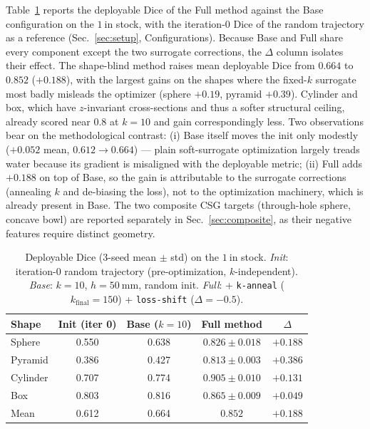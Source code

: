 Table~\ref{tab:main} reports the deployable Dice of the Full method against the
Base configuration on the $1~\mathrm{in}$ stock, with the iteration-0 Dice of the
random trajectory as a reference (Sec.~\ref{sec:setup}, Configurations). Because
Base and Full share every component except the two surrogate corrections, the
$\Delta$ column isolates their effect. The shape-blind method raises mean
deployable Dice from $0.664$ to $0.852$ ($+0.188$), with the largest gains on the
shapes where the fixed-$k$ surrogate most badly misleads the optimizer (sphere
$+0.19$, pyramid $+0.39$). Cylinder and box, which have $z$-invariant
cross-sections and thus a softer structural ceiling, already scored near $0.8$ at
$k{=}10$ and gain correspondingly less. Two observations bear on the
methodological contrast: (i) Base itself moves the init only modestly ($+0.052$
mean, $0.612 \to 0.664$) --- plain soft-surrogate optimization largely treads
water because its gradient is misaligned with the deployable metric; (ii) Full
adds $+0.188$ on top of Base, so the gain is attributable to the surrogate
corrections (annealing $k$ and de-biasing the loss), not to the optimization
machinery, which is already present in Base. The two composite CSG targets
(through-hole sphere, concave bowl) are reported separately in
Sec.~\ref{sec:composite}, as their negative features require distinct geometry.

\begin{table}[t]
  \centering
  \caption{Deployable Dice (3-seed mean $\pm$ std) on the $1~\mathrm{in}$ stock. \emph{Init}: iteration-0 random trajectory (pre-optimization, $k$-independent). \emph{Base}: $k{=}10$, $h{=}50~\mathrm{mm}$, random init. \emph{Full}: + \texttt{k-anneal} ($k_{\mathrm{final}}{=}150$) + \texttt{loss-shift} ($\Delta{=}-0.5$).}
  \label{tab:main}
  \small
  \begin{tabular}{lccc c}
    \toprule
    Shape & Init (iter 0) & Base ($k{=}10$) & Full method & $\Delta$ \\
    \midrule
    Sphere   & 0.550 & 0.638 & $\mathbf{0.826 \pm 0.018}$ & $+0.188$ \\
    Pyramid  & 0.386 & 0.427 & $\mathbf{0.813 \pm 0.003}$ & $+0.386$ \\
    Cylinder & 0.707 & 0.774 & $\mathbf{0.905 \pm 0.010}$ & $+0.131$ \\
    Box      & 0.803 & 0.816 & $\mathbf{0.865 \pm 0.009}$ & $+0.049$ \\
    \midrule
    Mean     & 0.612 & 0.664 & $\mathbf{0.852}$           & $+0.188$ \\
    \bottomrule
  \end{tabular}
\end{table}

